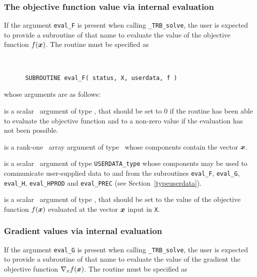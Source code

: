 \documentclass{galahad}
\newcommand{\packagename}{TRB}
\newcommand{\fullpackagename}{\libraryname\_\packagename}
\newcommand{\solver}{{\tt \fullpackagename\_solve}}
\begin{document}

\subsubsection{The objective function value via internal evaluation\label{ffv}}

If the argument {\tt eval\_F} is present when calling \solver, the
user is expected to provide a subroutine of that name to evaluate the
value of the objective function $f({\bm{x}})$.
The routine must be specified as

\def\baselinestretch{0.8}
{\tt
\begin{verbatim}
      SUBROUTINE eval_F( status, X, userdata, f )
\end{verbatim}
}
\def\baselinestretch{1.0}
\noindent whose arguments are as follows:

\begin{description}
 is a scalar \intentout\ argument of type \integer,
that should be set to 0 if the routine has been able to evaluate
the objective function
and to a non-zero value if the evaluation has not been possible.

 is a rank-one \intentin\ array argument of type \realdp\
whose components contain the vector ${\bm{x}}$.

 is a scalar \intentinout\ argument of type
{\tt USERDATA\_type} whose components may be used
to communicate user-supplied data to and from the
subroutines {\tt eval\_F}, {\tt eval\_G},
{\tt eval\_H}, {\tt eval\_HPROD} and {\tt eval\_PREC}
(see Section~\ref{typeuserdata}).

 is a scalar \intentout\ argument of type \realdp,
that should be set to the value of the objective function $f({\bm{x}})$
evaluated at the vector ${\bm{x}}$ input in {\tt X}.

\end{description}


\subsubsection{Gradient values via internal evaluation\label{gfv}}

If the argument {\tt eval\_G} is present when calling \solver, the
user is expected to provide a subroutine of that name to evaluate the
value of the gradient the objective function $\nabla_x f({\bm{x}})$.
The routine must be specified as
\end{document}
